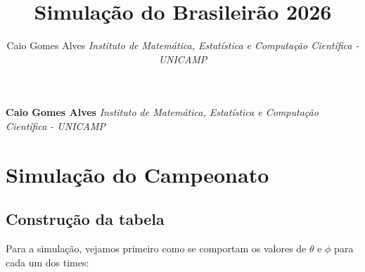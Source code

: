 \documentclass[11pt,]{article}
\title{Simulação do Brasileirão 2026  }
\author{\Large Caio Gomes
Alves\vspace{0.05in} \newline\normalsize\emph{Instituto de Matemática,
Estatística e Computação Científica - UNICAMP}  }
\date{}
\newcommand*{\authorfont}{\fontfamily{phv}\selectfont}
\begin{document}
%

{%
\setlength{\parindent}{0pt}
\thispagestyle{plain}
{\fontsize{18}{20}\selectfont\raggedright
\maketitle  %

}

{
   \vskip 13.5pt\relax \normalsize\fontsize{11}{12}
\textbf{\authorfont Caio Gomes Alves} \hskip 15pt \emph{\small Instituto
de Matemática, Estatística e Computação Científica - UNICAMP}   

}

}






\vskip -8.5pt



\noindent 

\hypertarget{simulauxe7uxe3o-do-campeonato}{%
\section{Simulação do Campeonato}\label{simulauxe7uxe3o-do-campeonato}}

\hypertarget{construuxe7uxe3o-da-tabela}{%
\subsection{Construção da tabela}\label{construuxe7uxe3o-da-tabela}}

Para a simulação, vejamos primeiro como se comportam os valores de
\(\theta\) e \(\phi\) para cada um dos times:
\end{document}
